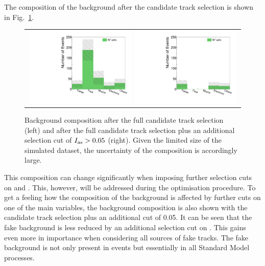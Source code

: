 The composition of the background after the candidate track selection is shown in Fig.~\ref{fig:BkgComposition}.
\begin{figure}[!b]
  \centering 
  \begin{tabular}{c}
    \includegraphics[width=0.49\textwidth]{figures/analysis/htrackgenParticleSmallRange_lin_chiTracksfullSelectionTrigger.pdf}
    \includegraphics[width=0.49\textwidth]{figures/analysis/htrackgenParticleSmallRange_lin_chiTracksfullSelectionPlusIasTrigger.pdf}
  \end{tabular}
  \caption{Background composition after the full candidate track selection (left) and after the full candidate track selection plus an additional selection cut of \mbox{$I_{\text{as}}>0.05$} (right). 
           Given the limited size of the simulated \WJets dataset, the uncertainty of the composition is accordingly large.}
  \label{fig:BkgComposition}
\end{figure}
This composition can change significantly when imposing further selection cuts on \pt and \ias.
This, however, will be addressed during the optimisation procedure.
To get a feeling how the composition of the background is affected by further cuts on one of the main variables, 
the background composition is also shown with the candidate track selection plus an additional \ias cut of 0.05.
It can be seen that the fake background is less reduced by an additional selection cut on \ias.
This gains even more in importance when considering all sources of fake tracks.
The fake background is not only present in \WJets events but essentially in all Standard Model processes.\\

